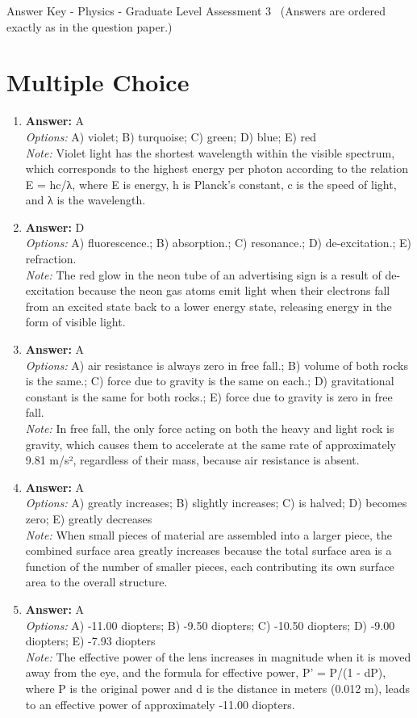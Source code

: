 \documentclass[12pt]{article}
\begin{document}
\begin{center}
Answer Key - Physics - Graduate Level Assessment 3 \
\small (Answers are ordered exactly as in the question paper.)
\end{center}

\section*{Multiple Choice}
\begin{enumerate}[label=\arabic*.]
\item \textbf{Answer:} A
\\ \textit{Options:} A) violet; B) turquoise; C) green; D) blue; E) red
\\ \textit{Note:} Violet light has the shortest wavelength within the visible spectrum, which corresponds to the highest energy per photon according to the relation E = hc/λ, where E is energy, h is Planck's constant, c is the speed of light, and λ is the wavelength.
\item \textbf{Answer:} D
\\ \textit{Options:} A) fluorescence.; B) absorption.; C) resonance.; D) de-excitation.; E) refraction.
\\ \textit{Note:} The red glow in the neon tube of an advertising sign is a result of de-excitation because the neon gas atoms emit light when their electrons fall from an excited state back to a lower energy state, releasing energy in the form of visible light.
\item \textbf{Answer:} A
\\ \textit{Options:} A) air resistance is always zero in free fall.; B) volume of both rocks is the same.; C) force due to gravity is the same on each.; D) gravitational constant is the same for both rocks.; E) force due to gravity is zero in free fall.
\\ \textit{Note:} In free fall, the only force acting on both the heavy and light rock is gravity, which causes them to accelerate at the same rate of approximately 9.81 m/s², regardless of their mass, because air resistance is absent.
\item \textbf{Answer:} A
\\ \textit{Options:} A) greatly increases; B) slightly increases; C) is halved; D) becomes zero; E) greatly decreases
\\ \textit{Note:} When small pieces of material are assembled into a larger piece, the combined surface area greatly increases because the total surface area is a function of the number of smaller pieces, each contributing its own surface area to the overall structure.
\item \textbf{Answer:} A
\\ \textit{Options:} A) -11.00 diopters; B) -9.50 diopters; C) -10.50 diopters; D) -9.00 diopters; E) -7.93 diopters
\\ \textit{Note:} The effective power of the lens increases in magnitude when it is moved away from the eye, and the formula for effective power, P' = P/(1 - dP), where P is the original power and d is the distance in meters (0.012 m), leads to an effective power of approximately -11.00 diopters.
\end{enumerate}
\end{document}
